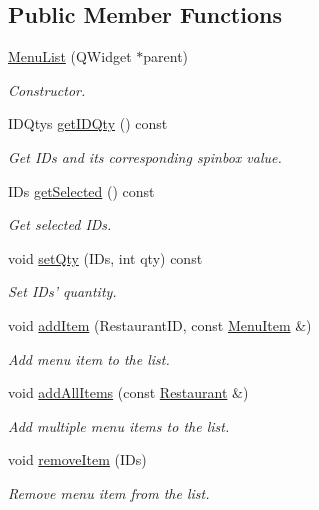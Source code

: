 \subsection*{Public Member Functions}
\begin{DoxyCompactItemize}
\item 
\hyperlink{classMenuList_afb9e9b923adf9028f08077a37aeedf21}{Menu\-List} (Q\-Widget $\ast$parent)
\begin{DoxyCompactList}\small\item\em Constructor. \end{DoxyCompactList}\item 
I\-D\-Qtys \hyperlink{classMenuList_abfec38982e1bf286a6c703493f04905f}{get\-I\-D\-Qty} () const 
\begin{DoxyCompactList}\small\item\em Get I\-Ds and its corresponding spinbox value. \end{DoxyCompactList}\item 
I\-Ds \hyperlink{classMenuList_a42df740f9efcd34a13379681ad52c687}{get\-Selected} () const 
\begin{DoxyCompactList}\small\item\em Get selected I\-Ds. \end{DoxyCompactList}\item 
void \hyperlink{classMenuList_ab6ff6611ff4f26da63f424d78f455b81}{set\-Qty} (I\-Ds, int qty) const 
\begin{DoxyCompactList}\small\item\em Set I\-Ds' quantity. \end{DoxyCompactList}\item 
void \hyperlink{classMenuList_abe044f2d6c96e53cdedcdc01dcce2c6b}{add\-Item} (Restaurant\-I\-D, const \hyperlink{classMenuItem}{Menu\-Item} \&)
\begin{DoxyCompactList}\small\item\em Add menu item to the list. \end{DoxyCompactList}\item 
void \hyperlink{classMenuList_ad3fa59fa9c0f70232bc7b3d249ec880a}{add\-All\-Items} (const \hyperlink{classRestaurant}{Restaurant} \&)
\begin{DoxyCompactList}\small\item\em Add multiple menu items to the list. \end{DoxyCompactList}\item 
void \hyperlink{classMenuList_acb345e457dcbcb3078aa85bb604cc579}{remove\-Item} (I\-Ds)
\begin{DoxyCompactList}\small\item\em Remove menu item from the list. \end{DoxyCompactList}\item 

\end{DoxyCompactItemize}
